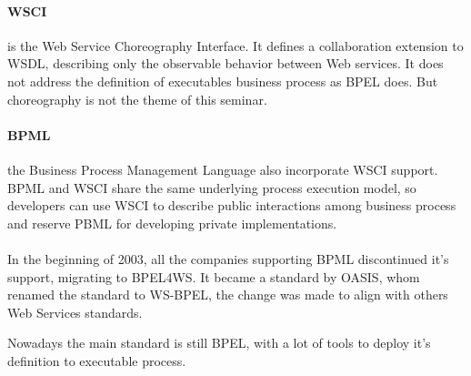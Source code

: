 \documentclass[11pt,a4paper]{article}
\begin{document}
\paragraph{WSCI}
is the Web Service Choreography Interface. It defines a collaboration extension to WSDL, describing only the observable behavior between Web services. It does not address the definition of executables business process as BPEL does. But choreography is not the theme of this seminar.

\paragraph{BPML} 
the Business Process Management Language also incorporate WSCI support. BPML and WSCI share the same underlying process execution model, so developers can use WSCI to describe public interactions among business process and reserve PBML for developing private implementations.\\ \\

In the beginning of 2003, all the companies supporting BPML discontinued it's support, migrating to BPEL4WS. It became a standard by OASIS, whom renamed the standard to WS-BPEL, the change was made to align with others Web Services standards.

Nowadays the main standard is still BPEL, with a lot of tools to deploy it's definition to executable process.
\end{document}
